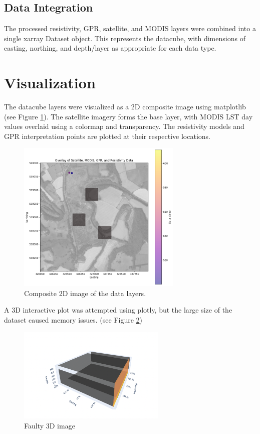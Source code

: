 \documentclass{article}
\begin{document}
\subsection{Data Integration}

The processed resistivity, GPR, satellite, and MODIS layers were combined into a single xarray Dataset object. This represents the datacube, with dimensions of easting, northing, and depth/layer as appropriate for each data type.

\section{Visualization}

The datacube layers were visualized as a 2D composite image using matplotlib (see Figure \ref{fig:composite}). The satellite imagery forms the base layer, with MODIS LST day values overlaid using a colormap and transparency. The resistivity models and GPR interpretation points are plotted at their respective locations.

\begin{figure}[H]
	\centering
	\includegraphics[width=0.7\textwidth]{datacube_composite.png}
	\caption{Composite 2D image of the data layers.}
	\label{fig:composite}
\end{figure}

A 3D interactive plot was attempted using plotly, but the large size of the dataset caused memory issues. (see Figure \ref{fig:3d})

\begin{figure}[H]
	\centering
	\includegraphics[width=0.63\textwidth]{faulty_3d.png}
	\caption{Faulty 3D image}
	\label{fig:3d}
\end{figure}
\end{document}
